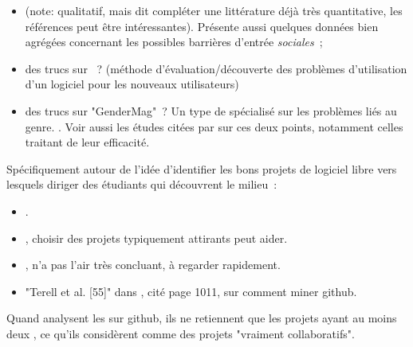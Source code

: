 
\begin{itemize}
    \item {} (note: qualitatif, mais dit compléter une littérature déjà très
        quantitative, les références peut être intéressantes). Présente aussi quelques données bien agrégées
        concernant les possibles barrières d'entrée \emph{sociales} ;
    \item des trucs sur  ? (méthode  d'évaluation/découverte des
        problèmes d'utilisation d'un logiciel pour les nouveaux utilisateurs)
    \item des trucs sur "GenderMag" ? Un type de  spécialisé sur les problèmes liés
        au genre. . Voir aussi les études citées par
        \textcite[p.~1005-1006]{barriers-2018} sur ces deux points, notamment celles traitant de leur
        efficacité.
\end{itemize}

Spécifiquement autour de l'idée d'identifier les bons projets de logiciel libre vers lesquels diriger des
étudiants qui découvrent le milieu :

\begin{itemize}
    \item {}.
    \item {}, choisir des projets typiquement attirants peut aider.
    \item {}, n'a pas l'air très concluant, à regarder rapidement.
    \item "Terell et al. [55]" dans \textcite{barriers-2018}, cité page 1011, sur comment miner \gls{github}.
\end{itemize}

Quand  analysent les  sur github, ils ne retiennent que les
projets ayant au moins deux , ce qu'ils considèrent comme des projets "vraiment
collaboratifs".
